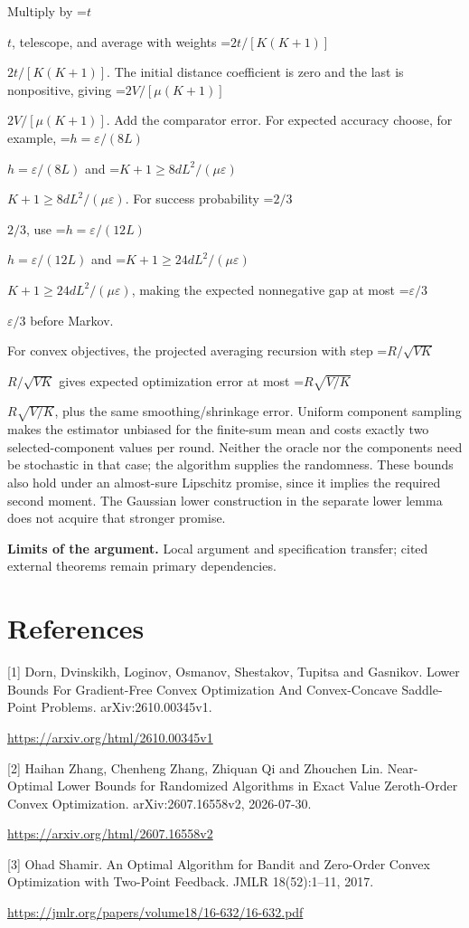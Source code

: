 \documentclass[10pt,a4paper]{article}
\newcommand{\AtlasMath}[1]{\par\begingroup\centering\setbox0=\hbox{$\displaystyle #1$}\ifdim\wd0>1.4\linewidth\typeout{ATLAS WIDE FORMULA: \the\wd0}\fi\ifdim\wd0>\linewidth\resizebox{\linewidth}{!}{\box0}\else\box0\fi\par\endgroup}
\newcommand{\AtlasInlineMath}[1]{\begingroup\setbox0=\hbox{$#1$}\ifdim\wd0>.4\linewidth\endgroup\AtlasMath{#1}\else\endgroup$#1$\fi}
\begin{document}
Multiply by \AtlasInlineMath{t}, telescope, and average with weights \AtlasInlineMath{2t/[K(K+1)]}. The initial distance coefficient is zero and the last is nonpositive, giving \AtlasInlineMath{2V/[\mu(K+1)]}. Add the comparator error. For expected accuracy choose, for example, \AtlasInlineMath{h=\varepsilon/(8L)} and \AtlasInlineMath{K+1\ge8dL^2/(\mu\varepsilon)}. For success probability \AtlasInlineMath{2/3}, use \AtlasInlineMath{h=\varepsilon/(12L)} and \AtlasInlineMath{K+1\ge24dL^2/(\mu\varepsilon)}, making the expected nonnegative gap at most \AtlasInlineMath{\varepsilon/3} before Markov.

For convex objectives, the projected averaging recursion with step \AtlasInlineMath{R/\sqrt{VK}} gives expected optimization error at most \AtlasInlineMath{R\sqrt{V/K}}, plus the same smoothing/shrinkage error. Uniform component sampling makes the estimator unbiased for the finite-sum mean and costs exactly two selected-component values per round. Neither the oracle nor the components need be stochastic in that case; the algorithm supplies the randomness. These bounds also hold under an almost-sure Lipschitz promise, since it implies the required second moment. The Gaussian lower construction in the separate lower lemma does not acquire that stronger promise.

\textbf{Limits of the argument.} Local argument and specification transfer; cited external theorems remain primary dependencies.

\section{References}
[1] Dorn, Dvinskikh, Loginov, Osmanov, Shestakov, Tupitsa and Gasnikov. Lower Bounds For Gradient-Free Convex Optimization And Convex-Concave Saddle-Point Problems. arXiv:2610.00345v1.

\url{https://arxiv.org/html/2610.00345v1}

[2] Haihan Zhang, Chenheng Zhang, Zhiquan Qi and Zhouchen Lin. Near-Optimal Lower Bounds for Randomized Algorithms in Exact Value Zeroth-Order Convex Optimization. arXiv:2607.16558v2, 2026-07-30.

\url{https://arxiv.org/html/2607.16558v2}

[3] Ohad Shamir. An Optimal Algorithm for Bandit and Zero-Order Convex Optimization with Two-Point Feedback. JMLR 18(52):1--11, 2017.

\url{https://jmlr.org/papers/volume18/16-632/16-632.pdf}
\end{document}
